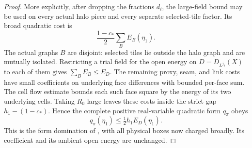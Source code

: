 \begin{proof}
More explicitly, after dropping the fractions $d_i$, the large-field
bound may be used on every actual halo piece and every separate
selected-tile factor.  Its broad quadratic cost is
\begin{equation}\label{eq:complex-broad-charge}
                   \frac{1-c_*}{2}\sum_B E_B(\eta_1).
\end{equation}
The actual graphs $B$ are disjoint: selected tiles lie outside the halo
graph and are mutually isolated.  Restricting a trial field for the
open energy on $D=D_{L^{j_0}}(X)$ to each of them gives
$\sum_BE_B\le E_D$.  The remaining proxy, seam, and link costs have
small coefficients on underlying face differences with bounded
per-face sum.  The cell flow estimate bounds each such face square
by the energy of its two underlying cells.  Taking $R_0$ large leaves
these costs inside the strict gap $h_1-(1-c_*)$.  Hence the complete
positive real-variable quadratic form $q_\pi$ obeys
\begin{equation}\label{eq:complex-form-domination}
                           q_\pi(\eta_1)\le\tfrac12h_1E_D(\eta_1).
\end{equation}
This is the form domination of \cite[Equation~(82)]{F}, with all physical boxes
now charged broadly.  Its coefficient and its ambient open energy are
unchanged.


\end{proof}
